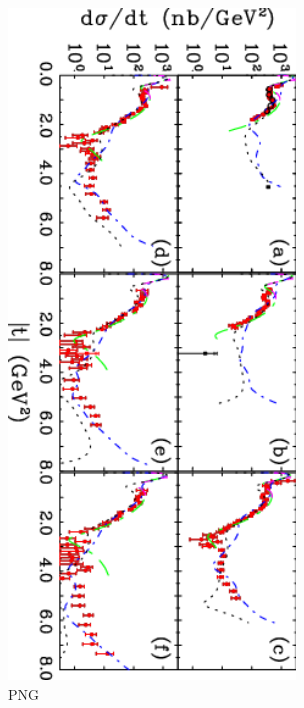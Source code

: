\documentclass[aps,prc,twocolumn,floatfix,showpacs,preprintnumbers,amsmath,amssymb,superscriptaddress,linenumbers]{revtex4-1}
\begin{document}
\begin{figure}[htb!]
\centerline{
        \includegraphics[width=3in, angle=90]{dsdt.png}}

        \caption {PNG} 
	\label{fig:t_dataPNG}
\end{figure}
\end{document}

